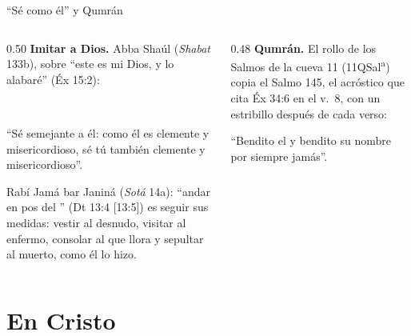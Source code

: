 \begin{frame}{``Sé como él'' y Qumrán}
\begin{columns}[t,onlytextwidth]
\begin{column}{0.50\textwidth}\small
\textbf{Imitar a Dios.} Abba Shaúl (\emph{Shabat} 133b), sobre ``este es mi Dios, y lo alabaré'' (Éx 15:2):
\begin{center}\\ \end{center}
``Sé semejante a él: como él es clemente y misericordioso, sé tú también clemente y misericordioso''.\par\smallskip
\scriptsize Rabí Jamá bar Janiná (\emph{Sotá} 14a): ``andar en pos del \SENOR'' (Dt 13:4 [13:5]) es seguir sus medidas: vestir al desnudo, visitar al enfermo, consolar al que llora y sepultar al muerto, como él lo hizo.
\end{column}
\begin{column}{0.48\textwidth}\small
\textbf{Qumrán.} El rollo de los Salmos de la cueva 11 (11QSal\textsuperscript{a}) copia el Salmo 145, el acróstico que cita Éx 34:6 en el v.~8, con un estribillo después de cada verso:
\begin{center}\end{center}
``Bendito el \SENOR{} y bendito su nombre por siempre jamás''.\par\smallskip
{}
\end{column}
\end{columns}\par\smallskip
{}
\end{frame}

\section{En Cristo}

